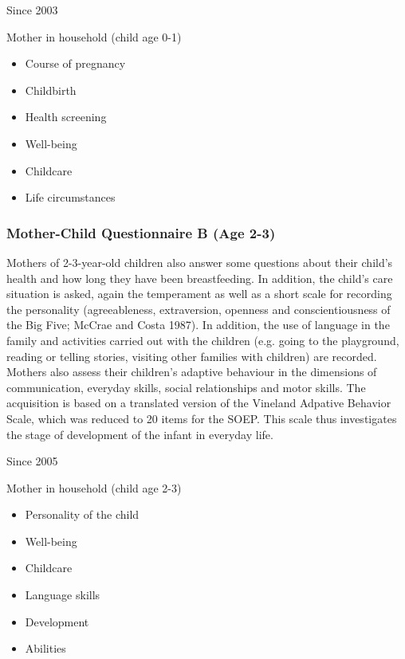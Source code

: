 \documentclass[letterpaper,10pt,openany,onesideH,english]{sphinxmanual}
\begin{document}
 Since 2003

 Mother in household (child age 0-1)

\begin{itemize}
\item {} 
Course of pregnancy

\item {} 
Childbirth

\item {} 
Health screening

\item {} 
Well-being

\item {} 
Childcare

\item {} 
Life circumstances

\end{itemize}


\subsubsection{Mother-Child Questionnaire B (Age 2-3)}
\label{\detokenize{Contents of SOEPcore/index:mother-child-questionnaire-b-age-2-3}}\label{\detokenize{Contents of SOEPcore/index:mother-child-questionnaire-b}}
Mothers of 2-3-year-old children also answer some questions about their child’s health and how long they have been breastfeeding. In addition, the child’s care situation is asked, again the temperament as well as a short scale for recording the personality (agreeableness, extraversion, openness and conscientiousness of the Big Five; McCrae and Costa 1987). In addition, the use of language in the family and activities carried out with the children (e.g. going to the playground, reading or telling stories, visiting other families with children) are recorded. Mothers also assess their children’s adaptive behaviour in the dimensions of communication, everyday skills, social relationships and motor skills. The acquisition is based on a translated version of the Vineland Adpative Behavior Scale, which was reduced to 20 items for the SOEP. This scale thus investigates the stage of development of the infant in everyday life.

 Since 2005

 Mother in household (child age 2-3)

\begin{itemize}
\item {} 
Personality of the child

\item {} 
Well-being

\item {} 
Childcare

\item {} 
Language skills

\item {} 
Development

\item {} 
Abilities

\end{itemize}
\end{document}
